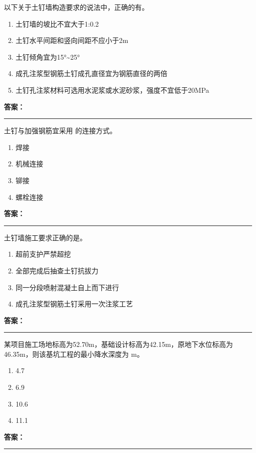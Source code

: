 \documentclass[UTF8,fontset=fandol,11pt]{ctexart}
\newcommand{\answerline}{\textcolor{answerred}{\rule{2.4cm}{0.7pt}}}
\begin{document}
\begin{quizbox}[title={第 8 题}]
以下关于土钉墙构造要求的说法中，正确的有。\\
\begin{enumerate}[label=\Alph*.]
\item 土钉墙的坡比不宜大于1:0.2
\item 土钉水平间距和竖向间距不应小于2m
\item 土钉倾角宜为15°\textasciitilde{}25°
\item 成孔注浆型钢筋土钉成孔直径宜为钢筋直径的两倍
\item 土钉孔注浆材料可选用水泥浆或水泥砂浆，强度不宜低于20MPa
\end{enumerate}
\textbf{\textcolor{answerred}{答案：}} \answerline
\end{quizbox}

\begin{quizbox}[title={第 9 题}]
土钉与加强钢筋宜采用 的连接方式。\\
\begin{enumerate}[label=\Alph*.]
\item 焊接
\item 机械连接
\item 铆接
\item 螺栓连接
\end{enumerate}
\textbf{\textcolor{answerred}{答案：}} \answerline
\end{quizbox}

\begin{quizbox}[title={第 10 题}]
土钉墙施工要求正确的是。\\
\begin{enumerate}[label=\Alph*.]
\item 超前支护严禁超挖
\item 全部完成后抽查土钉抗拔力
\item 同一分段喷射混凝土自上而下进行
\item 成孔注浆型钢筋土钉采用一次注浆工艺
\end{enumerate}
\textbf{\textcolor{answerred}{答案：}} \answerline
\end{quizbox}

\begin{quizbox}[title={第 11 题}]
某项目施工场地标高为52.70m，基础设计标高为42.15m，原地下水位标高为46.35m，则该基坑工程的最小降水深度为 m。\\
\begin{enumerate}[label=\Alph*.]
\item 4.7
\item 6.9
\item 10.6
\item 11.1
\end{enumerate}
\textbf{\textcolor{answerred}{答案：}} \answerline
\end{quizbox}
\end{document}

